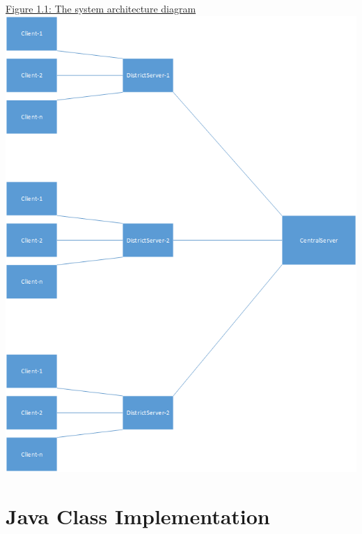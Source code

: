 \documentclass[11pt,english]{article}
\begin{document}
\newpage 
\underline{Figure 1.1: The system architecture diagram} 
\vspace{5mm}\\
\includegraphics[width=6.2in]{figures/FlowChart.png}


\section{Java Class Implementation}
\end{document}
